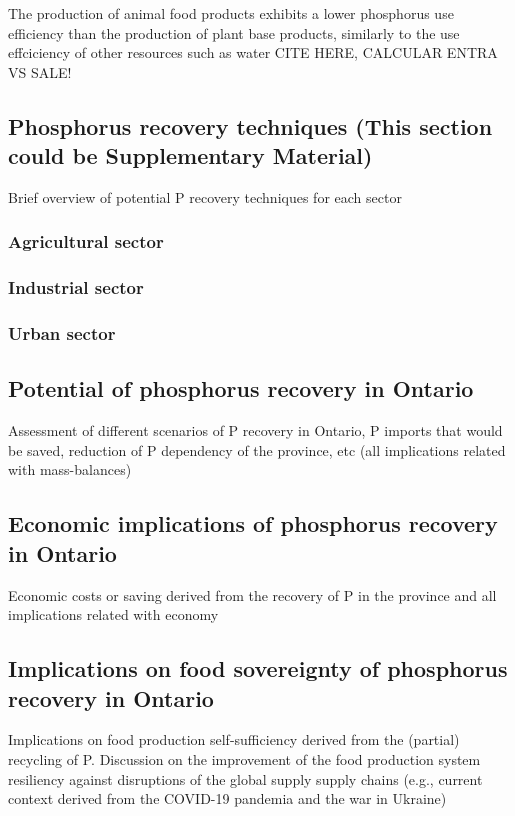 \documentclass[authoryear]{elsarticle}
\begin{document}
The production of animal food products exhibits a lower phosphorus use efficiency than the production of plant base products, similarly to the use effciciency of other resources such as water CITE HERE, CALCULAR ENTRA VS SALE!

\subsection{Phosphorus recovery techniques \textbf{(This section could be Supplementary Material)}}
Brief overview of potential P recovery techniques for each sector
\subsubsection{Agricultural sector}

\subsubsection{Industrial sector}

\subsubsection{Urban sector}

\subsection{Potential of phosphorus recovery in Ontario}
Assessment of different scenarios of P recovery in Ontario, P imports that would be saved, reduction of P dependency of the province, etc (all implications related with mass-balances)

\subsection{Economic implications of phosphorus recovery in Ontario}
Economic costs or saving derived from the recovery of P in the province and all implications related with economy

\subsection{Implications on food sovereignty of phosphorus recovery in Ontario}
Implications on food production self-sufficiency derived from the (partial) recycling of P. Discussion on the improvement of the food production system resiliency against disruptions of the global supply supply chains  (e.g., current context derived from the COVID-19 pandemia and the war in Ukraine)
\end{document}
